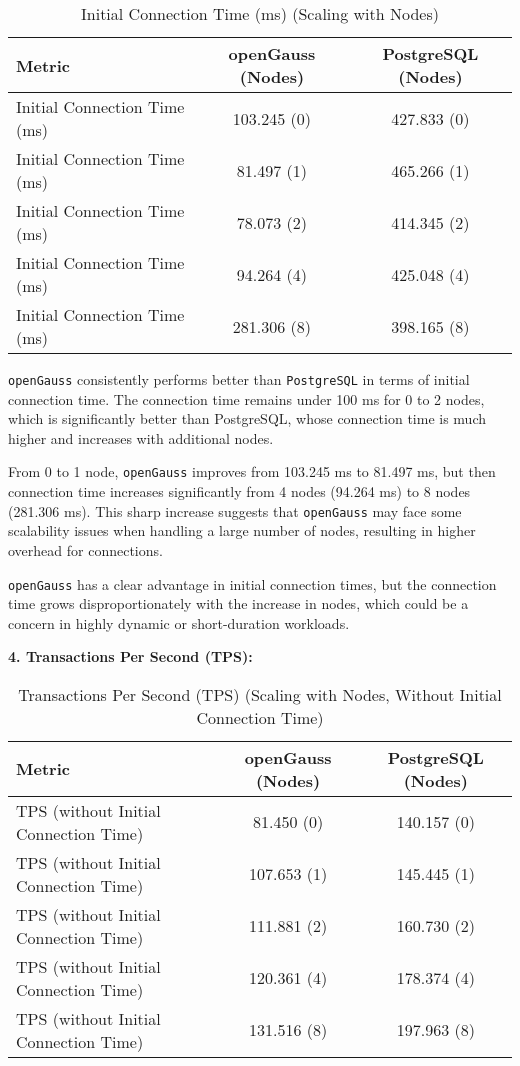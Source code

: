 \documentclass[12pt,a4paper,cs4size]{ctexart}
\begin{document}
\begin{table}[h!]
\centering
\captionsetup{labelformat=empty}
\begin{tabular}{|l|c|c|}
\hline
\textbf{Metric} & \textbf{openGauss (Nodes)} & \textbf{PostgreSQL (Nodes)} \\
\hline
Initial Connection Time (ms) & 103.245 (0) & 427.833 (0) \\
\hline
Initial Connection Time (ms) & 81.497 (1) & 465.266 (1) \\
\hline
Initial Connection Time (ms) & 78.073 (2) & 414.345 (2) \\
\hline
Initial Connection Time (ms) & 94.264 (4) & 425.048 (4) \\
\hline
Initial Connection Time (ms) & 281.306 (8) & 398.165 (8) \\
\hline
\end{tabular}
\caption{Initial Connection Time (ms) (Scaling with Nodes)}
\end{table}

\texttt{openGauss} consistently performs better than \texttt{PostgreSQL} in terms of initial connection time. The connection time remains under 100 ms for 0 to 2 nodes, which is significantly better than PostgreSQL, whose connection time is much higher and increases with additional nodes.

From 0 to 1 node, \texttt{openGauss} improves from 103.245 ms to 81.497 ms, but then connection time increases significantly from 4 nodes (94.264 ms) to 8 nodes (281.306 ms). This sharp increase suggests that \texttt{openGauss} may face some scalability issues when handling a large number of nodes, resulting in higher overhead for connections.

\texttt{openGauss} has a clear advantage in initial connection times, but the connection time grows disproportionately with the increase in nodes, which could be a concern in highly dynamic or short-duration workloads.

\textbf{4. Transactions Per Second (TPS):}

\begin{table}[h!]
\centering
\captionsetup{labelformat=empty}
\begin{tabular}{|l|c|c|}
\hline
\textbf{Metric} & \textbf{openGauss (Nodes)} & \textbf{PostgreSQL (Nodes)} \\
\hline
TPS (without Initial Connection Time) & 81.450 (0) & 140.157 (0) \\
\hline
TPS (without Initial Connection Time) & 107.653 (1) & 145.445 (1) \\
\hline
TPS (without Initial Connection Time) & 111.881 (2) & 160.730 (2) \\
\hline
TPS (without Initial Connection Time) & 120.361 (4) & 178.374 (4) \\
\hline
TPS (without Initial Connection Time) & 131.516 (8) & 197.963 (8) \\
\hline
\end{tabular}
\caption{Transactions Per Second (TPS) (Scaling with Nodes, Without Initial Connection Time)}
\end{table}
\end{document}

